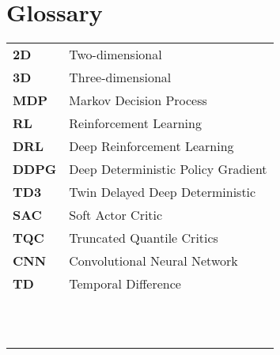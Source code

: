%
\chapter*{Glossary}

\begin{table}[!hb]
    \begin{tabular}{ll}
        \textbf{2D}   & Two-dimensional                    \\
        \textbf{3D}   & Three-dimensional                  \\
        \textbf{MDP}  & Markov Decision Process            \\
        \textbf{RL}   & Reinforcement Learning             \\
        \textbf{DRL}  & Deep Reinforcement Learning        \\
        \textbf{DDPG} & Deep Deterministic Policy Gradient \\
        \textbf{TD3}  & Twin Delayed Deep Deterministic    \\
        \textbf{SAC}  & Soft Actor Critic                  \\
        \textbf{TQC}  & Truncated Quantile Critics         \\
        \textbf{CNN}  & Convolutional Neural Network       \\
        \textbf{TD}   & Temporal Difference                \\
        \textbf{}     &                                    \\
        \textbf{}     &                                    \\
        \textbf{}     &                                    \\
        \textbf{}     &                                    \\
        \textbf{}     &                                    \\
        \textbf{}     &                                    \\
        \textbf{}     &                                    \\
        \textbf{}     &                                    \\
        \textbf{}     &                                    \\
        \textbf{}     &                                    \\
        \textbf{}     &                                    \\

\end{tabular}
\end{table}
